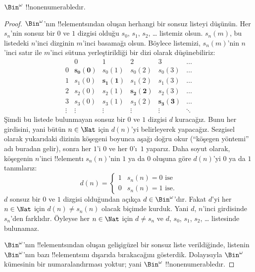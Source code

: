 \begin{thm}
$\Bin^\omega$ !!{nonenumerable}{}dır.
\end{thm}

\begin{proof}
$\Bin^\omega$'nın !!{element}s{}ından oluşan herhangi bir sonsuz listeyi düşünün.
Her $s_n$'nin sonsuz bir $0$ ve $1$ dizgisi olduğu $s_0$, $s_1$, $s_2$,
\dots{} listemiz olsun. $s_n(m)$, bu listedeki $n$'inci dizginin $m$'inci
basamağı olsun. Böylece listemizi, $s_n(m)$'nin $n$'inci satır ile $m$'inci
sütuna yerleştirildiği bir dizi olarak düşünebiliriz:
\[
\begin{array}{c|c|c|c|c|c}
& 0 & 1 & 2 & 3 & \dots \\\hline
0 & \mathbf{s_{0}(0)} & s_{0}(1) & s_{0}(2) & s_0(3) & \dots \\\hline
1 & s_{1}(0)& \mathbf{s_{1}(1)} & s_1(2) & s_1(3) & \dots \\\hline
2 & s_{2}(0)& s_{2}(1) & \mathbf{s_2(2)} & s_2(3) & \dots \\\hline
3 & s_{3}(0)& s_{3}(1) & s_3(2) & \mathbf{s_3(3)} & \dots \\\hline
\vdots & \vdots & \vdots & \vdots & \vdots & \mathbf{\ddots}
\end{array}
\]
Şimdi bu listede bulunmayan sonsuz bir $0$ ve $1$ dizgisi $d$ kuracağız.
Bunu her girdisini, yani bütün $n\in\Nat$ için $d(n)$'yi belirleyerek
yapacağız. Sezgisel olarak yukarıdaki dizinin köşegeni boyunca aşağı doğru
okur (``köşegen yöntemi'' adı buradan gelir), sonra her $1$'i $0$ ve her
$0$'ı~$1$ yaparız. Daha soyut olarak, köşegenin $n$'inci !!{element}{}ı
$s_n(n)$'nin $1$ ya da $0$ oluşuna göre $d(n)$'yi $0$ ya da $1$ tanımlarız:
\[
d(n) =
\begin{cases}
1 & \text{$s_{n}(n) = 0$ ise}\\
0 & \text{$s_{n}(n) = 1$ ise.}
\end{cases}
\]
$d$ sonsuz bir $0$ ve $1$ dizgisi olduğundan açıkça $d\in\Bin^\omega$'dır.
Fakat $d$'yi her $n\in\Nat$ için $d(n)\neq s_n(n)$ olacak biçimde kurduk.
Yani $d$, $n$'inci girdisinde $s_n$'den farklıdır. Öyleyse her
$n\in\Nat$ için $d\neq s_n$ ve $d$, $s_0$, $s_1$, $s_2$, \dots{} listesinde
bulunamaz.

$\Bin^\omega$'nın !!{element}s{}ından oluşan gelişigüzel bir sonsuz liste
verildiğinde, listenin $\Bin^\omega$'nın bazı !!{element}s{}ını
dışarıda bırakacağını gösterdik. Dolayısıyla $\Bin^\omega$ kümesinin bir
numaralandırması yoktur; yani $\Bin^\omega$ !!{nonenumerable}{}dır.
\end{proof}

